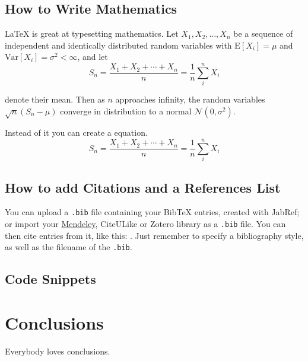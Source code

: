 \documentclass{article}
\begin{document}
\subsection{How to Write Mathematics}

\LaTeX{} is great at typesetting mathematics. Let $X_1, X_2, \ldots, X_n$ be a sequence of independent and identically distributed random variables with
$\text{E}[X_i] = \mu$ and $\text{Var}[X_i] = \sigma^2 < \infty$, and let
$$S_n = \frac{X_1 + X_2 + \cdots + X_n}{n}
      = \frac{1}{n}\sum_{i}^{n} X_i$$

denote their mean. Then as $n$ approaches infinity, the random variables $\sqrt{n}(S_n - \mu)$ converge in distribution to a normal $\mathcal{N}(0, \sigma^2)$.

Instead of it you can create a equation.
\begin{equation}
    S_n = \frac{X_1 + X_2 + \cdots + X_n}{n} = \frac{1}{n}\sum_{i}^{n} X_i
\end{equation}

\subsection{How to add Citations and a References List}

You can upload a \verb|.bib| file containing your BibTeX entries, created with JabRef; or import your \href{https://www.overleaf.com/blog/184}{Mendeley}, CiteULike or Zotero library as a \verb|.bib| file. You can then cite entries from it, like this: \cite{WorkshopLaTeX}. Just remember to specify a bibliography style, as well as the filename of the \verb|.bib|.



\subsection{Code Snippets}


\newpage
\section{Conclusions}

Everybody loves conclusions.

\newpage


\end{document}

